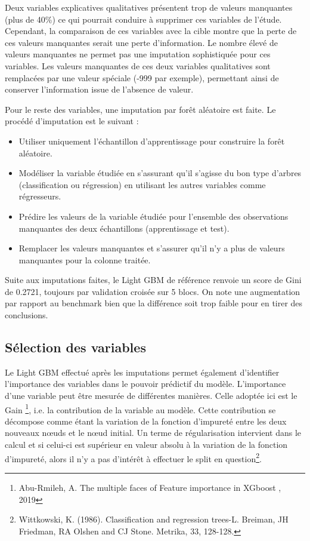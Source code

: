 \documentclass[french]{article}
\begin{document}
\begin{multicols}{2}
Deux variables explicatives  qualitatives présentent trop de valeurs manquantes (plus de 40\%) ce qui pourrait conduire à supprimer ces variables de l'étude. Cependant, la comparaison de ces variables avec la cible montre que la perte de ces valeurs manquantes serait une perte d'information. Le nombre élevé de valeurs manquantes ne permet pas une imputation sophistiquée pour ces variables. Les valeurs manquantes de ces deux variables qualitatives sont remplacées par une valeur spéciale (-999 par exemple), permettant ainsi de conserver l'information issue de l'absence de valeur.

Pour le reste des variables, une imputation par forêt aléatoire est faite. Le procédé d'imputation est le suivant :
\begin{itemize}
    \item Utiliser uniquement l'échantillon d'apprentissage pour construire la forêt aléatoire.
    \item Modéliser la variable étudiée en s'assurant qu'il s'agisse du bon type d'arbres (classification ou régression) en utilisant les autres variables comme régresseurs.
    \item Prédire les valeurs de la variable étudiée pour l'ensemble des observations manquantes des deux échantillons (apprentissage et test).
    \item Remplacer les valeurs manquantes et s'assurer qu'il n'y a plus de valeurs manquantes pour la colonne traitée.
\end{itemize}

Suite aux imputations faites, le Light GBM de référence renvoie un score de Gini de 0.2721, toujours par validation croisée sur 5 blocs. On note une augmentation par rapport au benchmark bien que la différence soit trop faible pour en tirer des conclusions.

\subsection{Sélection des variables}

Le Light GBM effectué après les imputations permet également d'identifier l'importance des variables dans le pouvoir prédictif du modèle. L'importance d'une variable peut être mesurée de différentes manières. Celle adoptée ici est le \og Gain \fg \footnote{\cite{twds1} Abu-Rmileh, A. \og The multiple faces of Feature importance in XGboost \fg, 2019}, i.e. la contribution de la variable au modèle.  Cette contribution se décompose comme étant la variation de la fonction d'impureté entre les deux nouveaux nœuds et le nœud initial. Un terme de régularisation intervient dans le calcul et si celui-ci est supérieur en valeur absolu à la variation de la fonction d'impureté, alors il n'y a pas d'intérêt à effectuer le split en question\footnote{\cite{wittkowski1986classification} Wittkowski, K. (1986). Classification and regression trees-L. Breiman, JH Friedman, RA Olshen and CJ Stone. Metrika, 33, 128-128. }.



\end{multicols}
\end{document}
